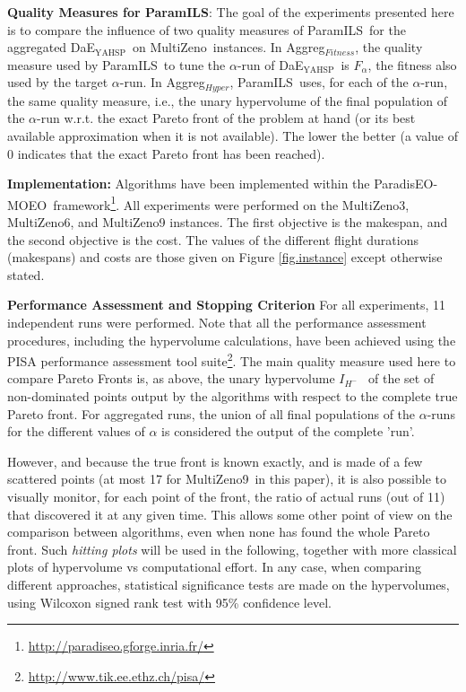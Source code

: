 \documentclass{llncs}
\newcommand{\DAEYAHSP}{{\sc DaE$_{\text{YAHSP}}$}}
\def\PARADISEO{{\sc ParadisEO-MOEO}}
\def\MULTIZENO{{\sc MultiZeno}}
\def\PARAMILS{{\sc ParamILS}}
\def\AGGREGHYPER{{Aggreg$_{Hyper}$}}
\def\AGGREGFITNESS{{Aggreg$_{Fitness}$}}
\renewcommand{\paragraph}[1]{{\bf #1}}
\begin{document}
\noindent
\paragraph{Quality Measures for {\sc \bf ParamILS}}: The goal of the experiments presented here is to compare the influence of two quality measures of \PARAMILS\ for the aggregated \DAEYAHSP\ on \MULTIZENO\ instances. In \AGGREGFITNESS, the quality measure used by \PARAMILS\ to tune the $\alpha$-run of \DAEYAHSP\ is $F_{\alpha}$, the fitness also used by the target $\alpha$-run. In \AGGREGHYPER, \PARAMILS\ uses, for each of the $\alpha$-run, the same quality measure, i.e., the unary hypervolume \cite{Zitzler2004} of the final population of the $\alpha$-run w.r.t. the exact Pareto front of the problem at hand (or its best available approximation when it is not available). The lower the better (a value of 0 indicates that the exact Pareto front has been reached). 


\noindent
\paragraph{Implementation:} Algorithms have been implemented within the \PARADISEO\ framework\footnote{\url{http://paradiseo.gforge.inria.fr/}}. All experiments were performed on the \MULTIZENO3,  \MULTIZENO6, and  \MULTIZENO9 instances. The first objective is the makespan, and the second objective is the cost. The values of the different flight durations (makespans) and costs are those given on Figure \ref{fig.instance} except otherwise stated.


\noindent
\paragraph{Performance Assessment and Stopping Criterion} 
For all experiments, 11 independent runs were performed. Note that all the performance assessment procedures, including the hypervolume calculations, have been achieved using the PISA performance assessment tool suite\footnote{\url{http://www.tik.ee.ethz.ch/pisa/}}.
The main quality measure used here to compare Pareto Fronts is, as above, the unary hypervolume  $I_{H^-}$~\cite{Zitzler2004} of the set of non-dominated points output by the algorithms with respect to the complete true Pareto front. For aggregated runs, the union of all final populations of the $\alpha$-runs for the different values of $\alpha$ is considered the output of the complete 'run'.

However, and because the true front is known exactly, and is made of a few scattered points (at most 17 for \MULTIZENO9\ in this paper), it is also possible to visually monitor, for each point of the front, the ratio of actual runs (out of 11) that discovered it at any given time. This allows some other point of view on the comparison between algorithms, even when none has found the whole Pareto front. Such {\em hitting plots} will be used in the following, together with more classical plots of hypervolume vs computational effort. In any case, when comparing different approaches, statistical significance tests are made on the hypervolumes, using Wilcoxon signed rank test with 95\% confidence level.
\end{document}
